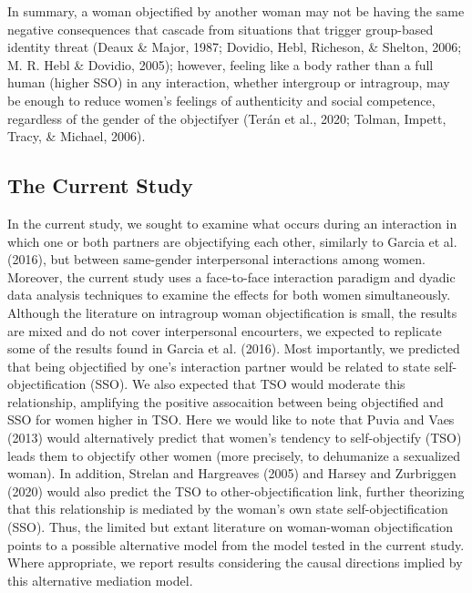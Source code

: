 \documentclass[man]{apa6}
\begin{document}
In summary, a woman objectified by another woman may not be having the
same negative consequences that cascade from situations that trigger
group-based identity threat (Deaux \& Major, 1987; Dovidio, Hebl,
Richeson, \& Shelton, 2006; M. R. Hebl \& Dovidio, 2005); however,
feeling like a body rather than a full human (higher SSO) in any
interaction, whether intergroup or intragroup, may be enough to reduce
women's feelings of authenticity and social competence, regardless of
the gender of the objectifyer (Terán et al., 2020; Tolman, Impett,
Tracy, \& Michael, 2006).

\subsection{The Current Study}\label{the-current-study}

In the current study, we sought to examine what occurs during an
interaction in which one or both partners are objectifying each other,
similarly to Garcia et al. (2016), but between same-gender interpersonal
interactions among women. Moreover, the current study uses a
face-to-face interaction paradigm and dyadic data analysis techniques to
examine the effects for both women simultaneously. Although the
literature on intragroup woman objectification is small, the results are
mixed and do not cover interpersonal encourters, we expected to
replicate some of the results found in Garcia et al. (2016). Most
importantly, we predicted that being objectified by one's interaction
partner would be related to state self-objectification (SSO). We also
expected that TSO would moderate this relationship, amplifying the
positive assocaition between being objectified and SSO for women higher
in TSO. Here we would like to note that Puvia and Vaes (2013) would
alternatively predict that women's tendency to self-objectify (TSO)
leads them to objectify other women (more precisely, to dehumanize a
sexualized woman). In addition, Strelan and Hargreaves (2005) and Harsey
and Zurbriggen (2020) would also predict the TSO to
other-objectification link, further theorizing that this relationship is
mediated by the woman's own state self-objectification (SSO). Thus, the
limited but extant literature on woman-woman objectification points to a
possible alternative model from the model tested in the current study.
Where appropriate, we report results considering the causal directions
implied by this alternative mediation model.
\end{document}
